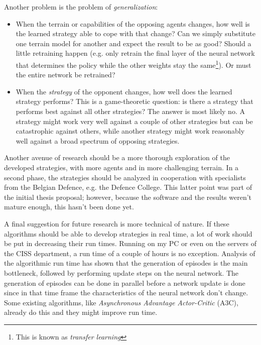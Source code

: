 Another problem is the problem of \emph{generalization}:
\begin{itemize}
    \item When the terrain or capabilities of the opposing agents changes, how well is the learned strategy able to cope with that change? Can we simply substitute one terrain model for another and expect the result to be as good? Should a little retraining happen (e.g. only retrain the final layer of the neural network that determines the policy while the other weights stay the same\footnote{This is known as \emph{transfer learning}}). Or must the entire network be retrained?
    \item When the \emph{strategy} of the opponent changes, how well does the learned strategy performs? This is a game-theoretic question: is there a strategy that performs best against all other strategies? The answer is most likely no. A strategy might work very well against a couple of other strategies but can be catastrophic against others, while another strategy might work reasonably well against a broad spectrum of opposing strategies.
\end{itemize}

Another avenue of research should be a more thorough exploration of the developed strategies, with more agents and in more challenging terrain. In a second phase, the strategies should be analyzed in cooperation with specialists from the Belgian Defence, e.g. the Defence College. This latter point was part of the initial thesis proposal; however, because the software and the results weren't mature enough, this hasn't been done yet.

A final suggestion for future research is more technical of nature. If these algorithms should be able to develop strategies in real time, a lot of work should be put in decreasing their run times. Running on my PC or even on the servers of the CISS department, a run time of a couple of hours is no exception. Analysis of the algorithmic run time has shown that the generation of episodes is the main bottleneck, followed by performing update steps on the neural network. The generation of episodes can be done in parallel before a network update is done since in that time frame the characteristics of the neural network don't change. Some existing algorithms, like \emph{Asynchronous Advantage Actor-Critic} (A3C)\cite{mnih2016asynchronous}, already do this and they might improve run time.
